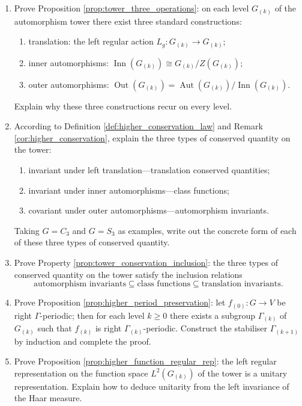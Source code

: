 \begin{enumerate}[leftmargin=3em, label=\textbf{Exercise \arabic*}]
    \item Prove Proposition \ref{prop:tower_three_operations}:
    on each level $G_{(k)}$ of the automorphism tower there exist three standard constructions:
    \begin{enumerate}[label=(\roman*)]
        \item translation: the left regular action $L_g:G_{(k)}\to G_{(k)}$;
        \item inner automorphisms: $\operatorname{Inn}(G_{(k)})\cong G_{(k)}/Z(G_{(k)})$;
        \item outer automorphisms: $\operatorname{Out}(G_{(k)})=\operatorname{Aut}(G_{(k)})/\operatorname{Inn}(G_{(k)})$.
    \end{enumerate}
    Explain why these three constructions recur on every level.

    \item According to Definition \ref{def:higher_conservation_law} and Remark \ref{cor:higher_conservation},
    explain the three types of conserved quantity on the tower:
    \begin{enumerate}[label=(\roman*)]
        \item invariant under left translation---translation conserved quantities;
        \item invariant under inner automorphisms---class functions;
        \item covariant under outer automorphisms---automorphism invariants.
    \end{enumerate}
    Taking $G=C_3$ and $G=S_3$ as examples, write out the concrete form of each of these three types of conserved quantity.

    \item Prove Property \ref{prop:tower_conservation_inclusion}:
    the three types of conserved quantity on the tower satisfy the inclusion relations
    \[
    \text{automorphism invariants}\subseteq\text{class functions}\subseteq\text{translation invariants}.
    \]

    \item Prove Proposition \ref{prop:higher_period_preservation}:
    let $f_{(0)}:G\to V$ be right $\Gamma$-periodic;
    then for each level $k\ge0$ there exists a subgroup $\Gamma_{(k)}$ of $G_{(k)}$
    such that $f_{(k)}$ is right $\Gamma_{(k)}$-periodic.
    Construct the stabiliser $\Gamma_{(k+1)}$ by induction and complete the proof.

    \item Prove Proposition \ref{prop:higher_function_regular_rep}:
    the left regular representation on the function space $L^2(G_{(k)})$ of the tower is a unitary representation.
    Explain how to deduce unitarity from the left invariance of the Haar measure.


\end{enumerate}
